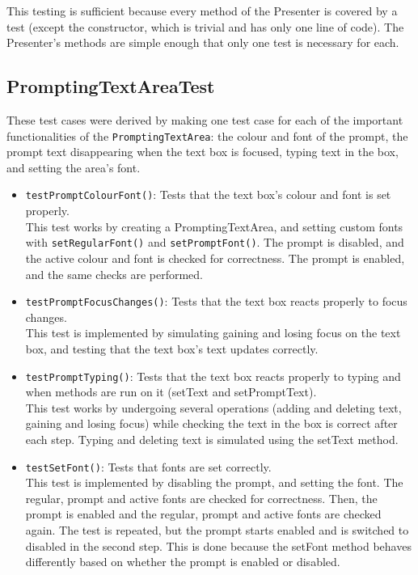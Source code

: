 \documentclass[11pt]{article}
\begin{document}
This testing is sufficient because every method of the Presenter is covered by a test (except the constructor, which is trivial and has only one line of code).  The Presenter's methods are simple enough that only one test is necessary for each.\\
\subsection{PromptingTextAreaTest}
\label{sec:org15fa09f}
These test cases were derived by making one test case for each of the important functionalities of the \texttt{PromptingTextArea}: the colour and font of the prompt, the prompt text disappearing when the text box is focused, typing text in the box, and setting the area's font.\\
\begin{itemize}
\item \texttt{testPromptColourFont()}: Tests that the text box's colour and font is set properly.\\
This test works by creating a PromptingTextArea, and setting custom fonts with \texttt{setRegularFont()} and \texttt{setPromptFont()}.  The prompt is disabled, and the active colour and font is checked for correctness.  The prompt is enabled, and the same checks are performed.\\
\item \texttt{testPromptFocusChanges()}: Tests that the text box reacts properly to focus changes.\\
This test is implemented by simulating gaining and losing focus on the text box, and testing that the text box's text updates correctly.\\
\item \texttt{testPromptTyping()}: Tests that the text box reacts properly to typing and when methods are run on it (setText and setPromptText).\\
This test works by undergoing several operations (adding and deleting text, gaining and losing focus) while checking the text in the box is correct after each step.  Typing and deleting text is simulated using the setText method.\\
\item \texttt{testSetFont()}: Tests that fonts are set correctly.\\
This test is implemented by disabling the prompt, and setting the font.  The regular, prompt and active fonts are checked for correctness.  Then, the prompt is enabled and the regular, prompt and active fonts are checked again.  The test is repeated, but the prompt starts enabled and is switched to disabled in the second step.  This is done because the setFont method behaves differently based on whether the prompt is enabled or disabled.\\
\end{itemize}
\end{document}
